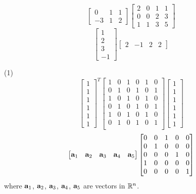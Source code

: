 \begin{tasks}[resume, style=enumerate]
\begin{displaymath}
\begin{bmatrix}
      0 & 1 & 1 \\
      -3 & 1 & 2
    \end{bmatrix}
    \begin{bmatrix}
      2 & 0 & 1 & 1 \\
      0 & 0 & 2 & 3 \\
      1 & 1 & 3 & 5
    \end{bmatrix}
  \end{displaymath}
\task
  \begin{displaymath}
    \begin{bmatrix}
      1 \\ 2 \\ 3 \\ -1
    \end{bmatrix}
    \begin{bmatrix}
      2 & -1 & 2 & 2
    \end{bmatrix}
  \end{displaymath}
\end{tasks}
\begin{tasks}[resume, style=enumerate](1)
\task
  \begin{displaymath}
    \begin{bmatrix}
      1 \\ 1 \\ 1 \\ 1 \\ 1 \\ 1
    \end{bmatrix}^T
    \begin{bmatrix}
      1 & 0 & 1 & 0 & 1 & 0 \\
      0 & 1 & 0 & 1 & 0 & 1 \\
      1 & 0 & 1 & 0 & 1 & 0 \\
      0 & 1 & 0 & 1 & 0 & 1 \\
      1 & 0 & 1 & 0 & 1 & 0 \\
      0 & 1 & 0 & 1 & 0 & 1 \\
    \end{bmatrix}
    \begin{bmatrix}
      1 \\ 1 \\ 1 \\ 1 \\ 1 \\ 1
    \end{bmatrix}
  \end{displaymath}
\task
  \begin{displaymath}
    \begin{bmatrix}
      \mathbf a_1 & \mathbf a_2 & \mathbf a_3 & \mathbf a_4 & \mathbf a_5
    \end{bmatrix}
    \begin{bmatrix}
      0 & 0 & 1 & 0 & 0 \\
      0 & 1 & 0 & 0 & 0 \\
      0 & 0 & 0 & 1 & 0 \\
      1 & 0 & 0 & 0 & 0 \\
      0 & 0 & 0 & 0 & 1
    \end{bmatrix}
  \end{displaymath}
  where $\mathbf a_1$, $\mathbf a_2$, $\mathbf a_3$, $\mathbf a_4$, $\mathbf a_5$ are vectors in $\mathbb R^n$.
\end{tasks}
